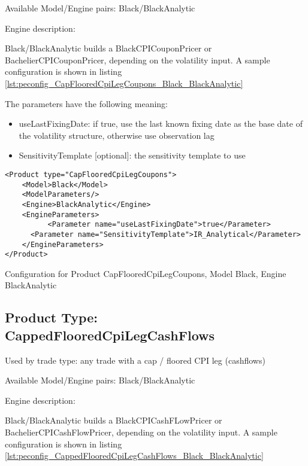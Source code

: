 Available Model/Engine pairs: Black/BlackAnalytic

Engine description:

Black/BlackAnalytic builds a BlackCPICouponPricer or BachelierCPICouponPricer, depending on the volatility input. A sample configuration is
shown in listing \ref{lst:peconfig_CapFlooredCpiLegCoupons_Black_BlackAnalytic}

The parameters have the following meaning:

\begin{itemize}
\item useLastFixingDate: if true, use the last known fixing date as the base date of the volatility structure, otherwise
  use observation lag        
\item SensitivityTemplate [optional]: the sensitivity template to use 
\end{itemize}

\begin{longlisting}
\begin{verbatim}
<Product type="CapFlooredCpiLegCoupons">
    <Model>Black</Model>
    <ModelParameters/>
    <Engine>BlackAnalytic</Engine>
    <EngineParameters>
          <Parameter name="useLastFixingDate">true</Parameter>
      <Parameter name="SensitivityTemplate">IR_Analytical</Parameter>
    </EngineParameters>
</Product>
\end{verbatim}
\caption{Configuration for Product CapFlooredCpiLegCoupons, Model Black, Engine BlackAnalytic}
\label{lst:peconfig_CapFlooredCpiLegCoupons_Black_BlackAnalytic}
\end{longlisting}

\subsection{Product Type: CappedFlooredCpiLegCashFlows}

Used by trade type: any trade with a cap / floored CPI leg (cashflows)

Available Model/Engine pairs: Black/BlackAnalytic

Engine description:

Black/BlackAnalytic builds a BlackCPICashFLowPricer or BachelierCPICashFlowPricer, depending on the volatility input. A sample configuration is
shown in listing \ref{lst:peconfig_CappedFlooredCpiLegCashFlows_Black_BlackAnalytic}

